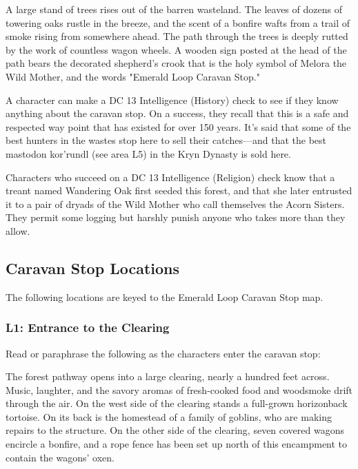 \documentclass[a4paper, 11pt, bg=full, twocolumn, nooutline]{dndbook}
\begin{document}
\begin{DndReadAloud}
A large stand of trees rises out of the barren wasteland. The leaves of dozens of towering oaks rustle in the breeze, and the scent of a bonfire wafts from a trail of smoke rising from somewhere ahead. The path through the trees is deeply rutted by the work of countless wagon wheels. A wooden sign posted at the head of the path bears the decorated shepherd's crook that is the holy symbol of Melora the Wild Mother, and the words "Emerald Loop Caravan Stop."
\end{DndReadAloud}

A character can make a DC 13 Intelligence (History) check to see if they know anything about the caravan stop. On a success, they recall that this is a safe and respected way point that has existed for over 150 years. It's said that some of the best hunters in the wastes stop here to sell their catches---and that the best mastodon kor'rundl (see area L5) in the Kryn Dynasty is sold here.

Characters who succeed on a DC 13 Intelligence (Religion) check know that a treant named Wandering Oak first seeded this forest, and that she later entrusted it to a pair of dryads of the Wild Mother who call themselves the Acorn Sisters. They permit some logging but harshly punish anyone who takes more than they allow.

\subsection{Caravan Stop Locations}

The following locations are keyed to the Emerald Loop Caravan Stop map.



\subsubsection{L1: Entrance to the Clearing}

Read or paraphrase the following as the characters enter the caravan stop:

\begin{DndReadAloud}
The forest pathway opens into a large clearing, nearly a hundred feet across. Music, laughter, and the savory aromas of fresh-cooked food and woodsmoke drift through the air. On the west side of the clearing stands a full-grown horizonback tortoise. On its back is the homestead of a family of goblins, who are making repairs to the structure. On the other side of the clearing, seven covered wagons encircle a bonfire, and a rope fence has been set up north of this encampment to contain the wagons' oxen.
\end{DndReadAloud}
\end{document}
